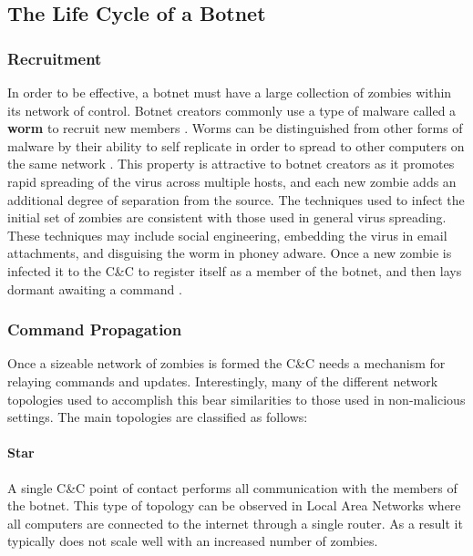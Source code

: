 \subsection{The Life Cycle of a Botnet}
\subsubsection{Recruitment}
In order to be effective, a botnet must have a large collection of zombies within its network of control.
Botnet creators commonly use a type of malware called a \textbf{worm} to recruit new members
\cite{lifecycle}.
Worms can be distinguished from other forms of malware by their ability to self replicate
in order to spread to other computers on the same network \cite{virustypes}.
This property is attractive to botnet creators as it promotes rapid spreading of the virus across
multiple hosts, and each new zombie adds an additional degree of separation from the source.
The techniques used to infect the initial set of zombies are consistent with
those used in general virus spreading.  These techniques may include social engineering,
embedding the virus in email attachments, and disguising the worm in phoney adware.
Once a new zombie is infected it  to the C\&C to register
itself as a member of the botnet, and then lays dormant awaiting a command
\cite{topology}.

\subsubsection{Command Propagation}
Once a sizeable network of zombies is formed the C\&C needs a mechanism for
relaying commands and updates. Interestingly, many of the different network topologies
used to accomplish this bear similarities to those used in non-malicious settings.
The main topologies are classified as follows:

\paragraph{Star \cite{topology}}
A single C\&C point of contact performs all communication with the members
of the botnet. This type of topology can be observed in Local Area Networks
where all computers are connected to the internet through a single router. As a
result it typically does not scale well with an increased number of zombies.

